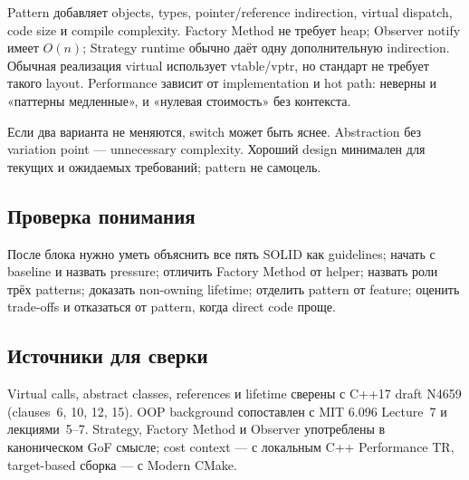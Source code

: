 Pattern добавляет objects, types, pointer/reference indirection, virtual
dispatch, code size и compile complexity. Factory Method не требует heap;
Observer notify имеет $O(n)$; Strategy runtime обычно даёт одну дополнительную
indirection. Обычная реализация virtual использует vtable/vptr, но стандарт
не требует такого layout. Performance зависит от implementation и hot path:
неверны и «паттерны медленные», и «нулевая стоимость» без контекста.

Если два варианта не меняются, switch может быть яснее. Abstraction без
variation point --- unnecessary complexity. Хороший design минимален для
текущих и ожидаемых требований; pattern не самоцель.

\subsection{Проверка понимания}
После блока нужно уметь объяснить все пять SOLID как guidelines; начать с
baseline и назвать pressure; отличить Factory Method от helper; назвать роли
трёх patterns; доказать non-owning lifetime; отделить pattern от feature;
оценить trade-offs и отказаться от pattern, когда direct code проще.

\subsection{Источники для сверки}
Virtual calls, abstract classes, references и lifetime сверены с C++17 draft
N4659 (clauses~6, 10, 12, 15). OOP background сопоставлен с MIT 6.096
Lecture~7 и лекциями~5--7. Strategy, Factory Method и Observer употреблены в
каноническом GoF смысле; cost context --- с локальным C++ Performance TR,
target-based сборка --- с Modern CMake.
